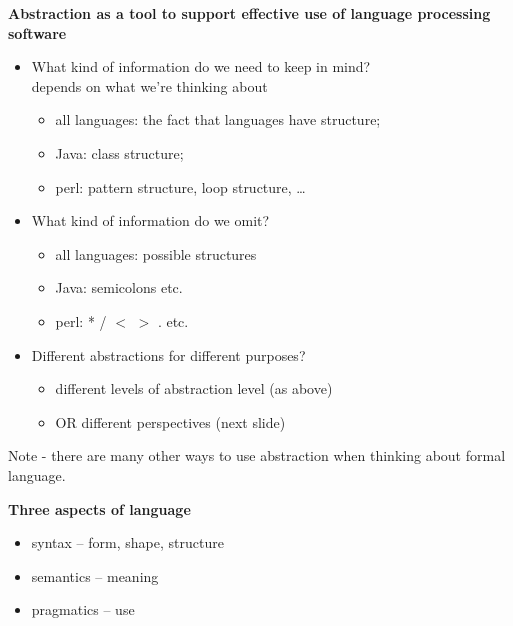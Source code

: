%
%
%
%
\begin{slide}{}
{\small
{\bf Abstraction as a tool to support effective use of language processing software}

\begin{itemize}
\item What kind of information do we need to keep in mind?\\
  depends on what we're thinking about
\begin{itemize}
\item all languages: the fact that languages have structure; 
\item Java: class structure;
\item perl: pattern structure, loop structure, \ldots
\end{itemize}
\item What kind of information do we omit?
\begin{itemize}
\item all languages: possible structures 
\item Java: semicolons etc.
\item perl: * / $<$ $>$ . etc.
\end{itemize}
\item Different abstractions for different purposes?\\
\begin{itemize}
\item different levels of abstraction level (as above)
\item OR different perspectives (next slide)
\end{itemize}
\end{itemize}
Note - there are many other ways to use abstraction when thinking
about formal language.
}
\end{slide}
%
%
\begin{slide}{}
{\bf Three aspects of language}
\begin{itemize}
\item syntax -- form, shape, structure 
\item semantics -- meaning
\item pragmatics -- use
\end{itemize}
\end{slide}
